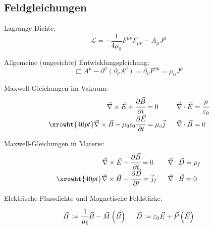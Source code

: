 \documentclass[11pt]{article}
\numberwithin{equation}{section}
\begin{document}
		\subsection{Feldgleichungen}
      Lagrange-Dichte:
      \begin{equation}
        \mathcal{L} = -\frac{1}{4\mu_0}F^{\mu\nu} F_{\mu\nu} - A_\mu J^\mu
      \end{equation}

      Allgemeine (ungeeichte) Entwicklungsgleichung:
      \begin{equation}
        \Box A^\mu-\partial^\mu\left(\partial_\nu A^\nu\right) = \partial_\nu F^{\nu\mu} =  \mu_0 J^\mu
      \end{equation}

			Maxwell-Gleichungen im Vakuum:
			\begin{equation}
			\begin{array}{rl}
				\vec{\nabla}\times \vec{E} + \cfrac{\partial\vec{B}}{\partial t} = 0 \phantom{\mu_0}
				&\;\; \vec{\nabla}\cdot\vec{E} = \cfrac{\rho}{\varepsilon_0} \\ \xrowht{40pt}
				\vec{\nabla}\times\vec{B} - \mu_0 \epsilon_0 \cfrac{\partial \vec{E}}{\partial t} = \mu_o\vec{j}
				&\;\; \vec{\nabla}\cdot\vec{B} = 0 \\
			\end{array}
			\end{equation}

			Maxwell-Gleichungen in Materie:
			\begin{equation}
			\begin{array}{rl}
				\vec{\nabla}\times \vec{E} + \cfrac{\partial\vec{B}}{\partial t} = 0 \phantom{_f}
				&\;\; \vec{\nabla}\cdot\vec{D} = \rho_f\\ \xrowht{40pt}
				\vec{\nabla}\times\vec{H} - \cfrac{\partial \vec{D}}{\partial t} = \vec{j}_f
				&\;\; \vec{\nabla}\cdot\vec{B} = 0 \\
			\end{array}
			\end{equation}

			Elektrische Flussdichte und Magnetische Feldstärke:
			\begin{equation} \label{eq:flussdichte-feldstärke}
			\begin{array}{cc}
				\vec{H} := \cfrac{1}{\mu_0}\Vec{B} - \vec{M}\left(\vec{B}\right)
				&\;\; \vec{D} := \varepsilon_0\vec{E} + \vec{P}\left(\vec{E}\right)
			\end{array}
			\end{equation}
\end{document}
